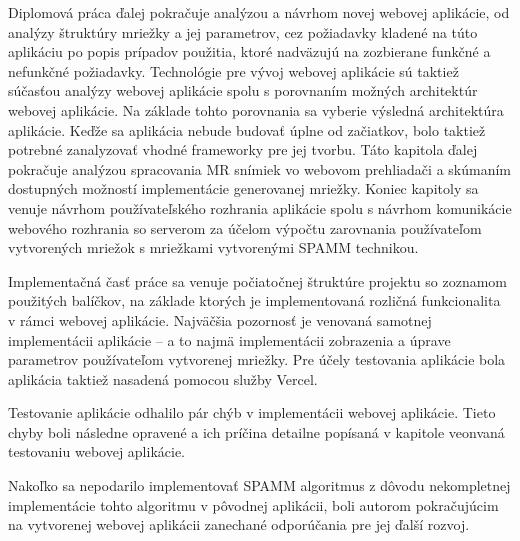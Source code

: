 Diplomová práca ďalej pokračuje analýzou a návrhom novej webovej aplikácie, od analýzy štruktúry mriežky a jej parametrov, cez požiadavky kladené na túto aplikáciu po popis prípadov použitia, ktoré nadväzujú na zozbierane funkčné a nefunkčné požiadavky. Technológie pre vývoj webovej aplikácie sú taktiež súčasťou analýzy webovej aplikácie spolu s porovnaním možných architektúr webovej aplikácie. Na základe tohto porovnania sa vyberie výsledná architektúra aplikácie. Keďže sa aplikácia nebude budovať úplne od začiatkov, bolo taktiež potrebné zanalyzovať vhodné frameworky pre jej tvorbu. Táto kapitola ďalej pokračuje analýzou spracovania MR snímiek vo webovom prehliadači a skúmaním dostupných možností implementácie generovanej mriežky. Koniec kapitoly sa venuje návrhom používateľského rozhrania aplikácie spolu s návrhom komunikácie webového rozhrania so serverom za účelom výpočtu zarovnania používateľom vytvorených mriežok s mriežkami vytvorenými SPAMM technikou.

Implementačná časť práce sa venuje počiatočnej štruktúre projektu so zoznamom použitých balíčkov, na základe ktorých je implementovaná rozličná funkcionalita v rámci webovej aplikácie. Najväčšia pozornosť je venovaná samotnej implementácii aplikácie -- a to najmä implementácii zobrazenia a úprave parametrov používateľom vytvorenej mriežky. Pre účely testovania aplikácie bola aplikácia taktiež nasadená pomocou služby Vercel.

Testovanie aplikácie odhalilo pár chýb v implementácii webovej aplikácie. Tieto chyby boli následne opravené a ich príčina detailne popísaná v kapitole veonvaná testovaniu webovej aplikácie.

Nakoľko sa nepodarilo implementovať SPAMM algoritmus z dôvodu nekompletnej implementácie tohto algoritmu v pôvodnej aplikácii, boli autorom pokračujúcim na vytvorenej webovej aplikácii zanechané odporúčania pre jej ďalší rozvoj.

